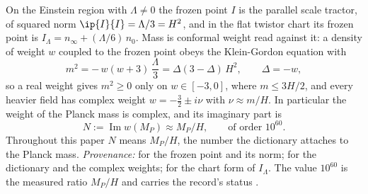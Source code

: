 On the Einstein region with $\Lambda \neq 0$ the frozen point $I$ is the parallel scale tractor, of squared norm $\ip{I}{I} = \Lambda/3 = H^{2}$, and in the flat twistor chart its frozen point is $I_{\Lambda} = n_{\infty} + (\Lambda/6)\,n_{0}$. Mass is conformal weight read against it: a density of weight $w$ coupled to the frozen point obeys the Klein-Gordon equation with
\[
m^{2} = -\,w(w+3)\,\frac{\Lambda}{3} = \Delta(3-\Delta)\,H^{2}, \qquad \Delta = -w,
\]
so a real weight gives $m^{2} \ge 0$ only on $w \in [-3, 0]$, where $m \le 3H/2$, and every heavier field has complex weight $w = -\tfrac32 \pm i\nu$ with $\nu \approx m/H$. In particular the weight of the Planck mass is complex, and its imaginary part is
\[
N := \operatorname{Im} w(M_{P}) \approx M_{P}/H, \qquad\text{of order } 10^{60}.
\]
Throughout this paper $N$ means $M_{P}/H$, the number the dictionary attaches to the Planck mass. \emph{Provenance:} \cite[Thms.~4.5, 4.7]{ButlerT6} for the frozen point and its norm; \cite[Thm.~3.1, Cor.~3.2]{ButlerT11} for the dictionary and the complex weights; \cite[Lem.~5.1]{ButlerT11} for the chart form of $I_{\Lambda}$. The value $10^{60}$ is the measured ratio $M_{P}/H$ and carries the record's status \cite{PDG2024}.
